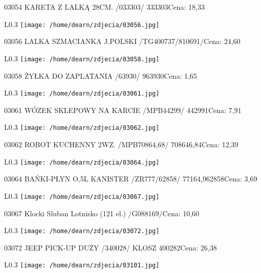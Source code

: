 03054 KARETA Z LALKĄ 28CM. /033303/                   333303Cena: 18,33\newline
\begin{wrapfigure}{L}{0.3\textwidth}
\texttt{[image: /home/dearn/zdjecia/03056.jpg]}
\end{wrapfigure}
03056 LALKA SZMACIANKA  J.POLSKI  /TG400737/810691/Cena: 24,60\newline
\begin{wrapfigure}{L}{0.3\textwidth}
\texttt{[image: /home/dearn/zdjecia/03058.jpg]}
\end{wrapfigure}
03058 ŻYŁKA DO ZAPLATANIA /63930/                     963930Cena: 1,65\newline
\begin{wrapfigure}{L}{0.3\textwidth}
\texttt{[image: /home/dearn/zdjecia/03061.jpg]}
\end{wrapfigure}
03061 WÓZEK SKLEPOWY NA KARCIE /MPB44299/             442991Cena: 7,91\newline
\begin{wrapfigure}{L}{0.3\textwidth}
\texttt{[image: /home/dearn/zdjecia/03062.jpg]}
\end{wrapfigure}
03062 ROBOT KUCHENNY 2WZ. /MPB70864,68/            708646,84Cena: 12,39\newline
\begin{wrapfigure}{L}{0.3\textwidth}
\texttt{[image: /home/dearn/zdjecia/03064.jpg]}
\end{wrapfigure}
03064 BAŃKI-PŁYN O,5L  KANISTER /ZR777/62858/   77164,962858Cena: 3,69\newline
\begin{wrapfigure}{L}{0.3\textwidth}
\texttt{[image: /home/dearn/zdjecia/03067.jpg]}
\end{wrapfigure}
03067 Klocki Sluban Lotnisko (121 el.) /G088169/Cena: 10,60\newline
\begin{wrapfigure}{L}{0.3\textwidth}
\texttt{[image: /home/dearn/zdjecia/03072.jpg]}
\end{wrapfigure}
03072 JEEP PICK-UP DUŻY /340028/   KLOSZ              400282Cena: 26,38\newline
\begin{wrapfigure}{L}{0.3\textwidth}
\texttt{[image: /home/dearn/zdjecia/03101.jpg]}
\end{wrapfigure}
